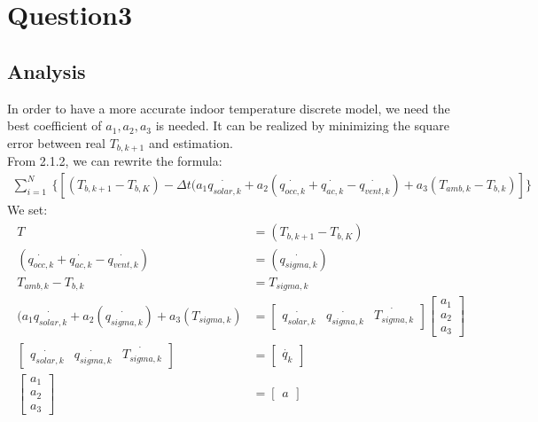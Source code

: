 \documentclass[titlepage,a4paper]{article}
\begin{document}
\section{Question3}

\fi

\setlength{\parindent}{0pt}
\setlength{\parskip}{0.5em}

    \subsection{Analysis}
        In order to have a more accurate indoor temperature discrete model,  we need the best coefficient of $a_1,a_2,a_3$ is needed. It can be realized by minimizing the square error between real $T_{b,k+1}$ and estimation.\\
        From 2.1.2, we can rewrite the formula:
        \begin{align}\label{1.10}
            \sum_{i=1}^N \:\{[(T_{b,k+1} - T_{b,K}) - \Delta t (a_1\dot{q_{solar,k}} + a_2(\dot{q_{occ,k}}+\dot{q_{ac,k}}-\dot{q_{vent,k}}) + a_3(T_{amb,k} - T_{b,k}) ]  \}
        \end{align}
        We set:
        \begin{align}
        \begin{split}
            T &= (T_{b,k+1} - T_{b,K})\\
            (\dot{q_{occ,k}}+\dot{q_{ac,k}}-\dot{q_{vent,k}}) &= (\dot{q_{sigma,k}})\\
            T_{amb,k} - T_{b,k} &= T_{sigma,k}\\
            (a_1\dot{q_{solar,k}} + a_2(\dot{q_{sigma,k}}) + a_3(T_{sigma,k}) &= 
            \begin{bmatrix} \dot{q_{solar,k}}&\dot{q_{sigma,k}}&\dot{T_{sigma,k}} \end{bmatrix} 
            \begin{bmatrix} a_1\\a_2\\a_3 \end{bmatrix}\\
            \begin{bmatrix} \dot{q_{solar,k}}&\dot{q_{sigma,k}}&\dot{T_{sigma,k}} \end{bmatrix} &= 
            \begin{bmatrix} \dot{q_k} \end{bmatrix}\\
            \begin{bmatrix} a_1\\a_2\\a_3 \end{bmatrix} &= 
            \begin{bmatrix} a \end{bmatrix}
        \end{split}
        \end{align}
\end{document}
